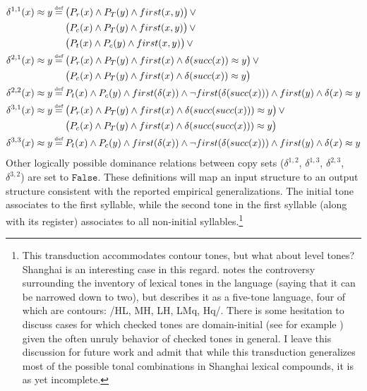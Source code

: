 \documentclass{article}
\newcommand\myeq{\mathrel{\stackrel{\makebox[0pt]{\mbox{\normalfont\tiny def}}}{=}}}
\newcommand{\ap}{\approx}
\begin{document}
\begin{equation}
\begin{aligned}
\delta^{1,1}(x)\ap y&\myeq \big(P_{r}(x)\land P_{T}(y)\land first(x,y)\big)\,\lor \\
&\quad\,\,\big(P_{c}(x)\land P_{T}(y)\land first(x,y)\big)\,\lor \\
&\quad\,\,\big(P_{t}(x)\land P_{c}(y)\land first(x,y)\big)\,\lor \\
\delta^{2,1}(x)\ap y &\myeq \big(P_{r}(x)\land P_{T}(y)\land first(x) \land \delta(succ(x))\ap y \big)\,\lor \\
&\quad\,\,\big(P_{c}(x)\land P_{T}(y)\land first(x)\land \delta(succ(x))\ap y \big) \\
\delta^{2,2}(x)\ap y &\myeq P_{t}(x)\land P_{c}(y)\land first(\delta(x))\land\neg first(\delta(succ(x)))\land first(y)\land\delta(x)\ap y \\
\delta^{3,1}(x)\ap y &\myeq \big(P_{r}(x)\land P_{T}(y)\land first(x) \land \delta(succ(succ(x)))\ap y \big)\,\lor \\
&\quad\,\,\big(P_{c}(x)\land P_{T}(y)\land first(x)\land \delta(succ(succ(x)))\ap y \big) \\
\delta^{3,3}(x)\ap y &\myeq P_{t}(x)\land P_{c}(y)\land first(\delta(x))\land\neg first(\delta(succ(x)))\land first(y)\land\delta(x)\ap y \\
\end{aligned}
\end{equation}
Other logically possible dominance relations between copy sets ($\delta^{1,2}$, $\delta^{1,3}$, $\delta^{2,3}$, $\delta^{3,2}$) are set to $\mathtt{False}$. These definitions will map an input structure to an output structure consistent with the reported empirical generalizations. The initial tone associates to the first syllable, while the second tone in the first syllable (along with its register) associates to all non-initial syllables.\footnote{This transduction accommodates contour tones, but what about level tones? Shanghai is an interesting case in this regard. \citet{Chen2000} notes the controversy surrounding the inventory of lexical tones in the language (saying that it can be narrowed down to two), but describes it as a five-tone language, four of which are contours: /HL, MH, LH, LMq, Hq/. There is some hesitation to discuss cases for which checked tones are domain-initial (see for example \citet{Zhang2007}) given the often unruly behavior of checked tones in general. I leave this discussion for future work and admit that while this transduction generalizes most of the possible tonal combinations in Shanghai lexical compounds, it is as yet incomplete.}\par
\end{document}
